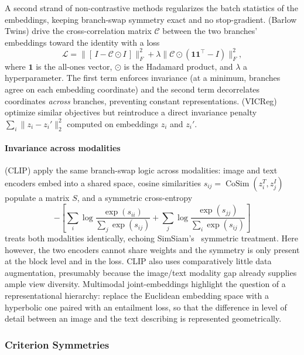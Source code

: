 \documentclass[mathematics,review,submit,moreauthors]{Definitions/mdpi}
\begin{document}
A second strand of non-contrastive methods regularizes the batch statistics of the embeddings, keeping branch-swap symmetry exact and no stop-gradient.
\citet{zbontar2021p3icml} (Barlow Twins) drive the cross-correlation matrix $\mathcal{C}$ between the two branches' embeddings toward the identity with a loss
$$
\mathcal{L}=\big\|[\,I-\mathcal{C}\odot I\,]\big\|_F^2+\lambda\big\|\mathcal{C}\odot(\boldsymbol 1\boldsymbol 1^\top-I)\big\|_F^2,
$$
where $\boldsymbol{1}$ is the all-ones vector, $\odot$ is the Hadamard product, and $\lambda$ a hyperparameter.
The first term enforces invariance (at a minimum, branches agree on each embedding coordinate) and the second term decorrelates coordinates \emph{across} branches, preventing constant representations.
\citet{bardes2022} (VICReg) optimize similar objectives but reintroduce a direct invariance penalty $\sum_i \lVert z_i-z_i'\rVert_2^2$ computed on embeddings $z_i$ and $z_i'$. 

\paragraph{Invariance across modalities}
\citet{radford2021p3icml} (CLIP) apply the same branch-swap logic across modalities: image and text encoders embed into a shared space, cosine similarities $s_{ij}=\operatorname{CoSim}(z_i^T,z_j^I)$ populate a matrix $S$, and a symmetric cross-entropy
$$
-\left[\sum_i\log\frac{\exp(s_{ii})}{\sum_j\exp(s_{ij})}+\sum_j\log\frac{\exp(s_{jj})}{\sum_i\exp(s_{ij})}\right]
$$
treats both modalities identically, echoing SimSiam's~\citep{chen2020a} symmetric treatment.
Here however, the two encoders cannot share weights and the symmetry is only present at the block level and in the loss.
CLIP also uses comparatively little data augmentation, presumably because the image/text modality gap already supplies ample view diversity.
Multimodal joint-embeddings highlight the question of a representational hierarchy: \citet{desai2023p4icml} replace the Euclidean embedding space with a hyperbolic one paired with an entailment loss, so that the difference in level of detail between an image and the text describing is represented geometrically.

\subsubsection{Criterion Symmetries}\label{sec:criterion-symmetries}
\end{document}
